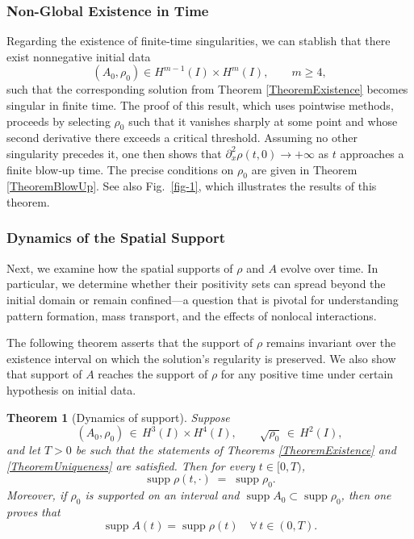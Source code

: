 \documentclass[12pt]{amsart}
\newtheorem{theorem}{Theorem}
\begin{document}
\subsubsection*{\textbf{Non-Global Existence in Time}} Regarding the existence of finite‐time singularities, we can stablish that
there exist nonnegative initial data 
\[
(A_0,\rho_0)\in H^{m-1}(I)\times H^m(I),
\qquad m\ge4,
\]
such that the corresponding solution from Theorem \ref{TheoremExistence} becomes singular in finite time.
The proof of this result, which uses pointwise methods, proceeds by selecting $\rho_0$ such  that it vanishes sharply at some point and whose second derivative there exceeds a critical threshold.  Assuming no other singularity precedes it, one then shows that $\partial_x^2\rho(t,0)\to+\infty$ as $t$ approaches a finite blow‐up time.  The precise conditions on $\rho_0$ are given in Theorem \ref{TheoremBlowUp}. See also Fig.~\ref{fig-1}, which illustrates the results of this theorem.

\subsubsection*{\textbf{Dynamics of the Spatial Support}}
Next, we examine how the spatial supports of $\rho$ and $A$ evolve over time. In particular, we determine whether their positivity sets can spread beyond the initial domain or remain confined—a question that is pivotal for understanding pattern formation, mass transport, and the effects of nonlocal interactions.

The following theorem asserts that the support of 
$\rho$ remains invariant over the existence interval on which the solution’s regularity is preserved. We also show that support of $A$ reaches the support of $\rho$ for any positive time under certain hypothesis on initial data.

\begin{theorem}[Dynamics of support]\label{TheoremSupport}
Suppose
\[
(A_0,\rho_0)\,\in\,H^3(I)\times H^4(I),
\qquad
\sqrt{\rho_0}\,\in\,H^2(I),
\]
and let $T>0$ be such that the statements of Theorems \ref{TheoremExistence} and \ref{TheoremUniqueness} are satisfied.
Then for every $t\in[0,T)$,
\[
\operatorname{supp}\rho(t,\cdot)
\;=\;
\operatorname{supp}\rho_0.
\]
Moreover, if $\rho_0$ is supported on an interval and 
$\displaystyle\operatorname{supp}A_0\subset\operatorname{supp}\rho_0$,
then one proves that 
\[
\operatorname{supp}A(t)
=\operatorname{supp}\rho(t)
\quad\forall\,t\in(0,T).
\]
\end{theorem}
\end{document}
